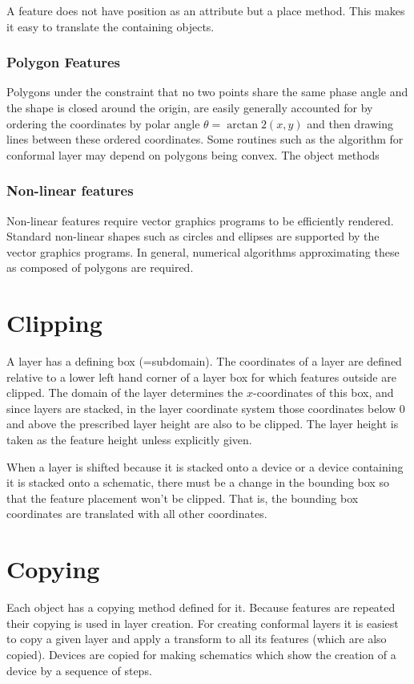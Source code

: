 \documentclass{article}
\begin{document}
A feature does not have position as an attribute but a place method. This makes it easy to translate the containing objects. 

\subsubsection{Polygon Features}
Polygons under the constraint that no two points share the same phase angle and the shape is closed around the origin, are easily generally accounted for by ordering the coordinates by polar angle $\theta = \arctan2(x,y)$ and then drawing lines between these ordered coordinates. Some routines such as the algorithm for conformal layer may depend on polygons being convex. The object methods 

\subsubsection{Non-linear features}
Non-linear features require vector graphics programs to be efficiently rendered. Standard non-linear shapes such as circles and ellipses are supported by the vector graphics programs. In general, numerical algorithms approximating these as composed of polygons are required. 

\section{Clipping}
A layer has a defining box (=subdomain). The coordinates of a layer are defined relative to a lower left hand corner of a layer box for which features outside are clipped. The domain of the layer determines the $x$-coordinates of this box, and since layers are stacked, in the layer coordinate system those coordinates below 0 and above the prescribed layer height are also to be clipped. The layer height is taken as the feature height unless explicitly given.

When a layer is shifted because it is stacked onto a device or a device containing it is stacked onto a schematic, there must be a change in the bounding box so that the feature placement won't be clipped. That is, the bounding box coordinates are translated with all other coordinates.

\section{Copying} 
Each object has a copying method defined for it. Because features are repeated their copying is used in layer creation. For creating conformal layers it is easiest to copy a given layer and apply a transform to all its features (which are also copied). Devices are copied for making schematics which show the creation of a device by a sequence of steps.
\end{document}

